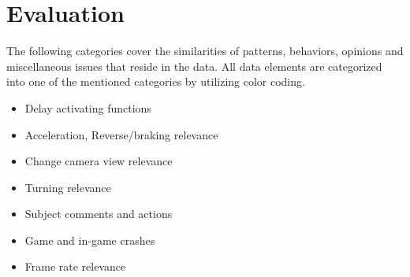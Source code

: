 \section{Evaluation}
The following categories cover the similarities of patterns, behaviors, opinions and miscellaneous issues that reside in the data. 
All data elements are categorized into one of the mentioned categories by utilizing color coding. 

\begin{itemize}
\item \colorbox{NotLavender}{Delay activating functions}
\item \colorbox{NotGreenYellow}{Acceleration, Reverse/braking relevance}
\item \colorbox{NotSkyBlue}{Change camera view relevance}
\item \colorbox{NotOrange}{Turning relevance}
\item \colorbox{NotRed}{Subject comments and actions}
\item \colorbox{NotGreen}{Game and in-game crashes}
\item \colorbox{NotPurple}{Frame rate relevance}

\end{itemize}

